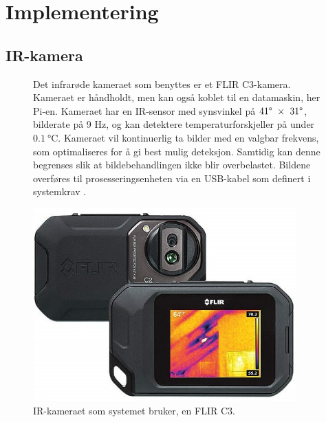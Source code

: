 \section{Implementering}
\label{sec:implementering}












\subsection{IR-kamera}\label{sec:impl:kamera}

\begin{figure}[!htbp]
\begin{minipage}[c]{0.58\textwidth}
Det infrarøde kameraet som benyttes er et FLIR C3-kamera.
Kameraet er håndholdt, men kan også koblet til en datamaskin, her Pi-en. 
Kameraet har en IR-sensor med synsvinkel på $41\degree\ \times\ 31\degree$, bilderate på 9 Hz, og kan detektere temperaturforskjeller på under $\SI{0.1}{\celsius}$. 
Kameraet vil kontinuerlig ta bilder med en valgbar frekvens, som optimaliseres for å gi best mulig deteksjon. 
Samtidig kan denne begrenses slik at bildebehandlingen ikke blir overbelastet. 
Bildene overføres til prosesseringsenheten via en USB-kabel som definert i systemkrav .
\end{minipage}
\hfill
\begin{minipage}[c]{0.38\textwidth}
    \centering
    \includegraphics[width=0.9\textwidth]{implementering/c3.png}
    \caption{IR-kameraet som systemet bruker, en FLIR C3.}
    \label{fig:c3}
\end{minipage}
\end{figure}

